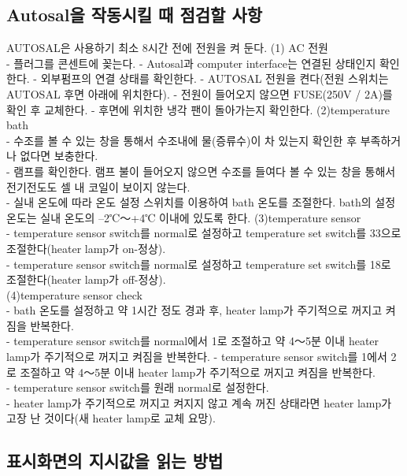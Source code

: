 \documentclass[
]{book}
\begin{document}
\hypertarget{autosaluxc744-uxc791uxb3d9uxc2dcuxd0ac-uxb54c-uxc810uxac80uxd560-uxc0acuxd56d}{%
\subsection{Autosal을 작동시킬 때 점검할 사항}\label{autosaluxc744-uxc791uxb3d9uxc2dcuxd0ac-uxb54c-uxc810uxac80uxd560-uxc0acuxd56d}}

AUTOSAL은 사용하기 최소 8시간 전에 전원을 켜 둔다.
(1) AC 전원\\
- 플러그를 콘센트에 꽂는다.
- Autosal과 computer interface는 연결된 상태인지 확인한다.
- 외부펌프의 연결 상태를 확인한다.
- AUTOSAL 전원을 켠다(전원 스위치는 AUTOSAL 후면 아래에 위치한다).
- 전원이 들어오지 않으면 FUSE(250V / 2A)를 확인 후 교체한다.
- 후면에 위치한 냉각 팬이 돌아가는지 확인한다.
(2)temperature bath\\
- 수조를 볼 수 있는 창을 통해서 수조내에 물(증류수)이 차 있는지 확인한 후 부족하거나 없다면 보충한다.\\
- 램프를 확인한다. 램프 불이 들어오지 않으면 수조를 들여다 볼 수 있는 창을 통해서 전기전도도 셀 내 코일이 보이지 않는다.\\
- 실내 온도에 따라 온도 설정 스위치를 이용하여 bath 온도를 조절한다. bath의 설정온도는 실내 온도의 --2℃～+4℃ 이내에 있도록 한다.
(3)temperature sensor\\
- temperature sensor switch를 normal로 설정하고 temperature set switch를 33으로 조절한다(heater lamp가 on-정상).\\
- temperature sensor switch를 normal로 설정하고 temperature set switch를 18로 조절한다(heater lamp가 off-정상).\\
(4)temperature sensor check\\
- bath 온도를 설정하고 약 1시간 정도 경과 후, heater lamp가 주기적으로 꺼지고 켜짐을 반복한다.\\
- temperature sensor switch를 normal에서 1로 조절하고 약 4～5분 이내 heater lamp가 주기적으로 꺼지고 켜짐을 반복한다.
- temperature sensor switch를 1에서 2로 조절하고 약 4～5분 이내 heater lamp가 주기적으로 꺼지고 켜짐을 반복한다.\\
- temperature sensor switch를 원래 normal로 설정한다.\\
- heater lamp가 주기적으로 꺼지고 켜지지 않고 계속 꺼진 상태라면 heater lamp가 고장 난 것이다(새 heater lamp로 교체 요망).

\hypertarget{uxd45cuxc2dcuxd654uxba74uxc758-uxc9c0uxc2dcuxac12uxc744-uxc77duxb294-uxbc29uxbc95}{%
\subsection{표시화면의 지시값을 읽는 방법}\label{uxd45cuxc2dcuxd654uxba74uxc758-uxc9c0uxc2dcuxac12uxc744-uxc77duxb294-uxbc29uxbc95}}
\end{document}
